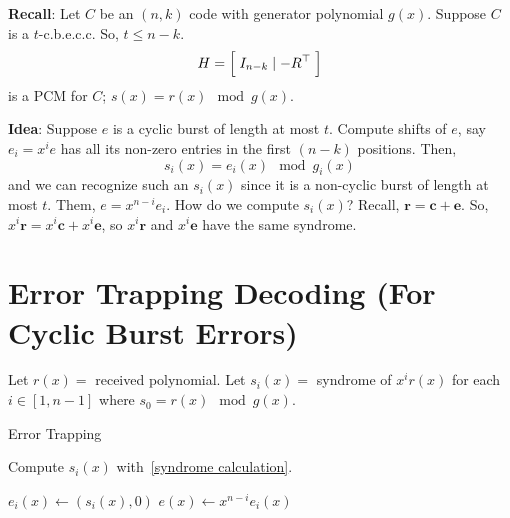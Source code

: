 \textbf{Recall}: Let $ C $ be an $ (n,k) $ code with generator polynomial
$ g(x) $. Suppose $ C $ is a $ t $-c.b.e.c.c. So, $ t\leqslant n-k $.
\[ H= \Bigl[\; I_{n-k}\mid -R^\top \;\Bigr] \]
is a PCM for $ C $; $ s(x)=r(x)\mod g(x) $.

\textbf{Idea}: Suppose $ e $ is a cyclic burst of length at most $ t $.
Compute shifts of $ e $, say $ e_i=x^i e $ has all its non-zero entries in the first
$ (n-k) $ positions. Then,
\[ s_i(x)=e_i(x)\mod g_i(x) \]
and we can recognize such an $ s_i(x) $ since it is a non-cyclic burst of length
at most $ t $. Them, $ e=x^{n-i}e_i $. How do we compute $ s_i(x) $? Recall,
$ \bm{r}=\bm{c}+\bm{e} $. So, $ x^i \bm{r}=x^i\bm{c}+x^i\bm{e} $, so
$ x^i \bm{r} $ and $ x^i\bm{e} $ have the same syndrome.

\section{Error Trapping Decoding (For Cyclic Burst Errors)}
Let $ r(x)= $ received polynomial. Let $ s_i(x)= $ syndrome of $ x^i r(x) $ for
each $ i\in[1,n-1] $ where $ s_0=r(x)\mod g(x) $.

\begin{algbox}
    \begin{algorithm}[H]
        \DontPrintSemicolon{}
        \caption{Error Trapping}

         {
            Compute $ s_i(x) $ with~\ref{syndrome calculation}.

             {
                $ e_i(x)\gets(s_i(x),0) $\;
                $ e(x)\gets x^{n-i}e_i(x) $\;
            }
        }
        \Return{}
    \end{algorithm}
\end{algbox}

